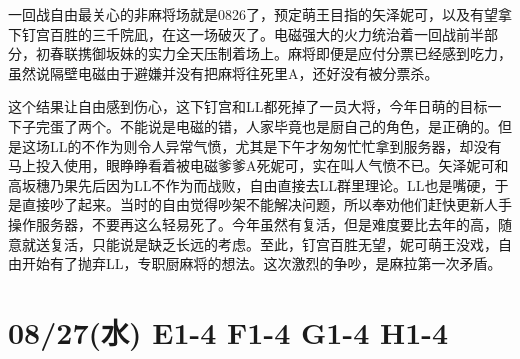一回战自由最关心的非麻将场就是0826了，预定萌王目指的矢泽妮可，以及有望拿下钉宫百胜的三千院凪，在这一场破灭了。电磁强大的火力统治着一回战前半部分，初春联携御坂妹的实力全天压制着场上。麻将即便是应付分票已经感到吃力，虽然说隔壁电磁由于避嫌并没有把麻将往死里A，还好没有被分票杀。

这个结果让自由感到伤心，这下钉宫和LL都死掉了一员大将，今年日萌的目标一下子完蛋了两个。不能说是电磁的错，人家毕竟也是厨自己的角色，是正确的。但是这场LL的不作为则令人异常气愤，尤其是下午才匆匆忙忙拿到服务器，却没有马上投入使用，眼睁睁看着被电磁爹爹A死妮可，实在叫人气愤不已。矢泽妮可和高坂穗乃果先后因为LL不作为而战败，自由直接去LL群里理论。LL也是嘴硬，于是直接吵了起来。当时的自由觉得吵架不能解决问题，所以奉劝他们赶快更新人手操作服务器，不要再这么轻易死了。今年虽然有复活，但是难度要比去年的高，随意就送复活，只能说是缺乏长远的考虑。至此，钉宫百胜无望，妮可萌王没戏，自由开始有了抛弃LL，专职厨麻将的想法。这次激烈的争吵，是麻拉第一次矛盾。

\section{08/27(水) E1-4 F1-4 G1-4 H1-4}


